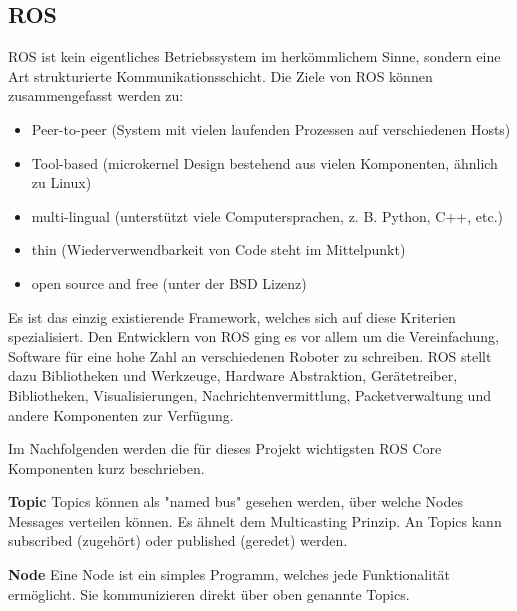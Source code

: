 \documentclass[12pt]{article}
\begin{document}
\subsection{ROS}
ROS ist kein eigentliches Betriebssystem im herkömmlichem Sinne, sondern eine Art strukturierte Kommunikationsschicht.
Die Ziele von ROS können zusammengefasst werden zu:
\begin{itemize}
\item Peer-to-peer (System mit vielen laufenden Prozessen auf verschiedenen Hosts)
\item Tool-based (microkernel Design bestehend aus vielen Komponenten, ähnlich zu Linux)
\item multi-lingual (unterstützt viele Computersprachen, z. B. Python, C++, etc.)
\item thin (Wiederverwendbarkeit von Code steht im Mittelpunkt)
\item open source and free (unter der BSD Lizenz)
\end{itemize}
Es ist das einzig existierende Framework, welches sich auf diese Kriterien spezialisiert.
Den Entwicklern von ROS ging es vor allem um die Vereinfachung, Software für eine hohe Zahl an verschiedenen Roboter zu schreiben.
ROS stellt dazu Bibliotheken und Werkzeuge, Hardware Abstraktion, Gerätetreiber, Bibliotheken, Visualisierungen, Nachrichtenvermittlung, Packetverwaltung und andere Komponenten zur Verfügung.

Im Nachfolgenden werden die für dieses Projekt wichtigsten ROS Core Komponenten kurz beschrieben.

{\bf Topic} Topics können als "named bus" gesehen werden, über welche Nodes Messages verteilen können. Es ähnelt dem Multicasting Prinzip. An Topics kann subscribed (zugehört) oder published (geredet) werden.

{\bf Node} Eine Node ist ein simples Programm, welches jede Funktionalität ermöglicht.  Sie kommunizieren direkt über oben genannte Topics.
\end{document}
